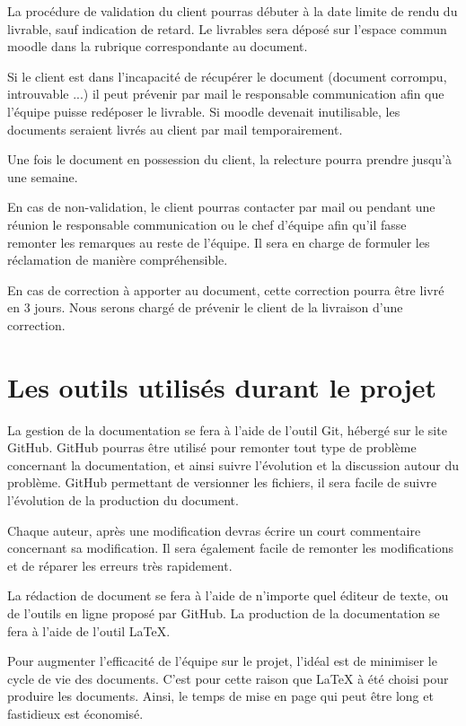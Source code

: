 La procédure de validation du client pourras débuter à la date limite de rendu du livrable, sauf indication de retard. Le livrables sera déposé sur l'espace commun moodle dans la rubrique correspondante au document.

Si le client est dans l’incapacité de récupérer le document (document corrompu, introuvable ...) il peut prévenir par mail le responsable communication afin que l’équipe puisse redéposer le livrable.
Si moodle devenait inutilisable, les documents seraient livrés au client par mail temporairement.

Une fois le document en possession du client, la relecture pourra prendre jusqu’à une semaine.

En cas de non-validation, le client pourras contacter par mail ou pendant une réunion le responsable communication ou le chef d’équipe afin qu’il fasse remonter les remarques au reste de l’équipe.
Il sera en charge de formuler les réclamation de manière compréhensible.

En cas de correction à apporter au document, cette correction pourra être livré en 3 jours.
Nous serons chargé de prévenir le client de la livraison d’une correction.

\section{Les outils utilisés durant le projet}

La gestion de la documentation se fera à l’aide de l’outil Git, hébergé sur le site GitHub.
GitHub pourras être utilisé pour remonter tout type de problème concernant la documentation, et ainsi suivre l'évolution et la discussion autour du problème.
GitHub permettant de versionner les fichiers, il sera facile de suivre l'évolution de la production du document.

Chaque auteur, après une modification devras écrire un court commentaire concernant sa modification.
Il sera également facile de remonter les modifications et de réparer les erreurs très rapidement.

La rédaction de document se fera à l’aide de n’importe quel éditeur de texte, ou de l'outils en ligne proposé par GitHub.
La production de la documentation se fera à l’aide de l'outil LaTeX.

Pour augmenter l'efficacité de l'équipe sur le projet, l’idéal est de minimiser le cycle de vie des documents.
C'est pour cette raison que LaTeX à été choisi pour produire les documents.
Ainsi, le temps de mise en page qui peut être long et fastidieux est économisé.


